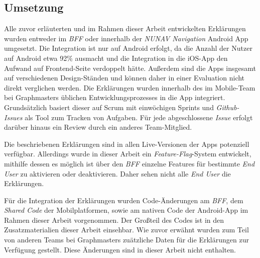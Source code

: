 \subsection{Umsetzung}

Alle zuvor erläuterten und im Rahmen dieser Arbeit entwickelten Erklärungen wurden entweder im \textit{BFF} oder innerhalb der \textit{NUNAV Navigation} Android App umgesetzt. Die Integration ist nur auf Android erfolgt, da die Anzahl der Nutzer auf Android etwa 92\% ausmacht und die Integration in die iOS-App den Aufwand auf Frontend-Seite verdoppelt hätte. Außerdem sind die Apps insgesamt auf verschiedenen Design-Ständen und können daher in einer Evaluation nicht direkt verglichen werden. Die Erklärungen wurden innerhalb des im Mobile-Team bei Graphmasters üblichen Entwicklungsprozesses in die App integriert. Grundsätzlich basiert dieser auf Scrum mit einwöchigen Sprints und \textit{Github-Issues} als Tool zum Tracken von Aufgaben. Für jede abgeschlossene \textit{Issue} erfolgt darüber hinaus ein Review durch ein anderes Team-Mitglied.

Die beschriebenen Erklärungen sind in allen Live-Versionen der Apps potenziell verfügbar. Allerdings wurde in dieser Arbeit ein \textit{Feature-Flag}-System entwickelt, mithilfe dessen es möglich ist über den \textit{BFF} einzelne Features für bestimmte \textit{End User} zu aktivieren oder deaktivieren. Daher sehen nicht alle \textit{End User} die Erklärungen.

Für die Integration der Erklärungen wurden Code-Änderungen am \textit{BFF}, dem \textit{Shared Code} der Mobilplatformen, sowie am nativen Code der Android-App im Rahmen dieser Arbeit vorgenommen. Der Großteil des Codes ist in den Zusatzmaterialien dieser Arbeit einsehbar. Wie zuvor erwähnt wurden zum Teil von anderen Teams bei Graphmasters zuätzliche Daten für die Erklärungen zur Verfügung gestellt. Diese Änderungen sind in dieser Arbeit nicht enthalten.

\newpage